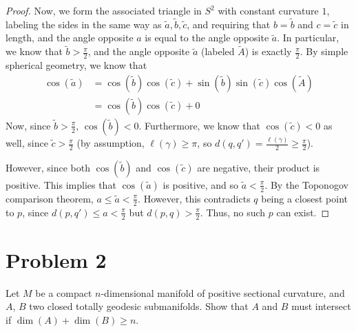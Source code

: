 \documentclass[fontsize=11pt]{scrartcl} %
\numberwithin{equation}{section} %
\numberwithin{figure}{section} %
\numberwithin{table}{section} %
\begin{document}
\begin{proof}
    Now, we form the associated triangle in $S^2$ with constant curvature $1$,
    labeling the sides in the same way as $\tilde{a},\tilde{b},\tilde{c}$, and
    requiring that $b = \tilde{b}$ and $c=\tilde{c}$ in length, and the angle
    opposite $a$ is equal to the angle opposite $\tilde{a}$. In
    particular, we know that $\tilde{b}>\frac{\pi}{2}$, and the angle opposite
    $\tilde{a}$ (labeled $\tilde{A}$) is exactly $\frac{\pi}{2}$. By simple
    spherical geometry, we know that
    \[
        \begin{aligned}
            \cos(\tilde{a}) &= \cos(\tilde{b})\cos(\tilde{c}) +
            \sin(\tilde{b})\sin(\tilde{c})\cos(\tilde{A})\\
            &= \cos(\tilde{b})\cos(\tilde{c}) + 0
        \end{aligned}
    \]
    Now, since $\tilde{b}>\frac{\pi}{2}$, $\cos(\tilde{b})<0$. Furthermore, we
    know that $\cos(\tilde{c})<0$ as well, since $\tilde{c}>\frac{\pi}{2}$ (by
        assumption, $\ell(\gamma)\geq \pi$, so
    $d(q,q')=\frac{\ell(\gamma)}{2}\geq \frac{\pi}{2}$).

    However, since both $\cos(\tilde{b})$ and $\cos(\tilde{c})$ are negative,
    their product is positive. This implies that $\cos(\tilde{a})$ is positive,
    and so $\tilde{a}<\frac{\pi}{2}$. By the Toponogov comparison theorem,
    $a\leq \tilde{a}<\frac{\pi}{2}$. However, this contradicts $q$ being a
    closest point to $p$, since $d(p,q')\leq a <\frac{\pi}{2}$ but
    $d(p,q)>\frac{\pi}{2}$. Thus, no such $p$ can exist.


\end{proof}

\newpage

\section*{Problem 2}
Let $M$ be a compact $n$-dimensional manifold of positive sectional curvature,
and $A$, $B$ two closed totally geodesic submanifolds. Show that $A$ and $B$
must intersect if $\dim(A) + \dim(B)\geq n$.
\end{document}
